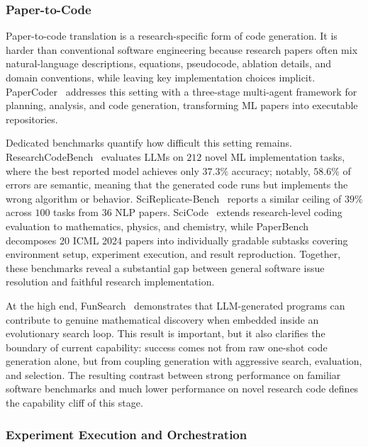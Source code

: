 \subsubsection{Paper-to-Code}
\label{sec:paper2code}

Paper-to-code translation is a research-specific form of code generation. It is harder than conventional software engineering because research papers often mix natural-language descriptions, equations, pseudocode, ablation details, and domain conventions, while leaving key implementation choices implicit. PaperCoder~\cite{papercoder2025} addresses this setting with a three-stage multi-agent framework for planning, analysis, and code generation, transforming ML papers into executable repositories.

Dedicated benchmarks quantify how difficult this setting remains. ResearchCodeBench~\cite{researchcodebench2025} evaluates LLMs on $212$ novel ML implementation tasks, where the best reported model achieves only $37.3\%$ accuracy; notably, $58.6\%$ of errors are semantic, meaning that the generated code runs but implements the wrong algorithm or behavior. SciReplicate-Bench~\cite{scireplicatebench2025} reports a similar ceiling of $39\%$ across $100$ tasks from $36$ NLP papers. SciCode~\cite{scicode2024} extends research-level coding evaluation to mathematics, physics, and chemistry, while PaperBench~\cite{paperbench2025} decomposes 20 ICML 2024 papers into individually gradable subtasks covering environment setup, experiment execution, and result reproduction. Together, these benchmarks reveal a substantial gap between general software issue resolution and faithful research implementation.

At the high end, FunSearch~\cite{funsearch2024} demonstrates that LLM-generated programs can contribute to genuine mathematical discovery when embedded inside an evolutionary search loop. This result is important, but it also clarifies the boundary of current capability: success comes not from raw one-shot code generation alone, but from coupling generation with aggressive search, evaluation, and selection. The resulting contrast between strong performance on familiar software benchmarks and much lower performance on novel research code defines the capability cliff of this stage.



\subsubsection{Experiment Execution and Orchestration}
\label{sec:exp_execution}

